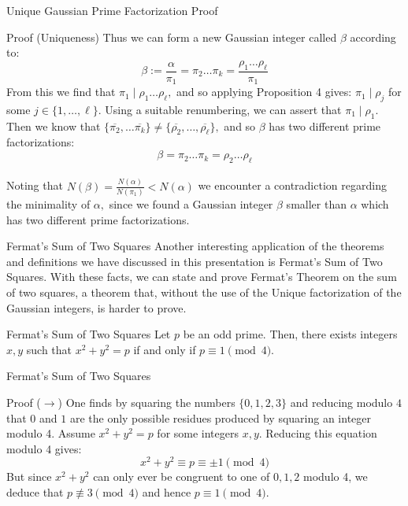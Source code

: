 \begin{frame}{Unique Gaussian Prime Factorization Proof}
\begin{block}{Proof (Uniqueness)}
Thus we can form a new Gaussian integer called $\beta$ according to:
$$\beta := \frac{\alpha}{\pi_1} =\pi_2\ldots\pi_k=\frac{\rho_1\ldots\rho_\ell}{\pi_1}$$
From this we find that $\pi_1 \mid \rho_1\ldots\rho_\ell,$ and so applying Proposition 4 gives: $\pi_1\mid \rho_j$ for some $j\in\{1,\ldots,\ell\}.$ Using a suitable renumbering, we can assert that $\pi_1\mid\rho_1.$ Then we know that $\{\overline{\pi_2},\ldots \overline{\pi_k}\}\neq\{\overline{\rho_2},\dots,\overline{\rho_{\ell}}\}, $ and so $\beta$ has two different prime factorizations:
$$\beta = \pi_2\ldots \pi_k = \rho_2 \ldots \rho_{\ell}$$\\
 Noting that $N(\beta)=\frac{N(\alpha)}{N(\pi_1)}<N(\alpha)$  we encounter a contradiction regarding the minimality of $\alpha,$ since we found a Gaussian integer $\beta$ smaller than $\alpha$ which has two different prime factorizations. 
    \end{block}
\end{frame}

\begin{frame}{Fermat’s Sum of Two Squares}
    Another interesting application of the theorems and definitions we have discussed in this presentation is Fermat’s Sum of Two Squares. With these facts, we can state and prove Fermat’s Theorem on the sum of two squares, a theorem that, without the use of the Unique factorization of the Gaussian integers, is harder to prove.
    
    \begin{block}{Fermat’s Sum of Two Squares}
    Let $p$ be an odd prime. Then, there exists integers $x,y$ such that $x^2+y^2=p$ if and only if $p\equiv 1 \pmod 4.$\\
    \end{block}
\end{frame}

\begin{frame}{Fermat’s Sum of Two Squares}
    \begin{block}{Proof ($\rightarrow$)} One finds by squaring the numbers $\{0,1,2,3\}$ and reducing modulo $4$ that $0$ and $1$ are the only possible residues produced by squaring an integer modulo 4. Assume $x^2+y^2=p$ for some integers $x,y.$  Reducing this equation modulo 4 gives: $$x^2+y^2\equiv p \equiv \pm 1 \pmod 4$$ But since $x^2+y^2$ can only ever be congruent to one of $0,1,2$ modulo 4, we deduce that $p\not\equiv 3 \pmod 4$ and hence $p\equiv 1 \pmod 4.$\\
\end{block}
\end{frame}


